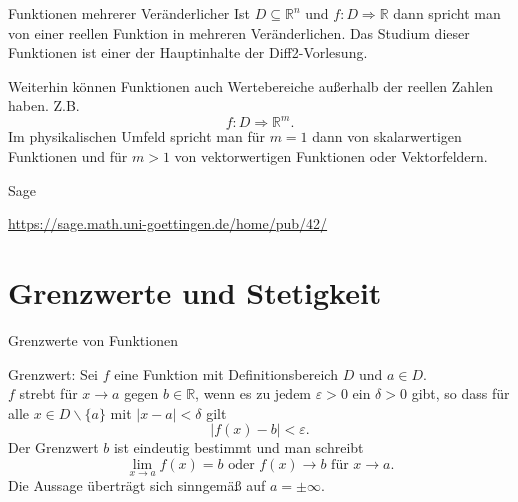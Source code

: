 \documentclass[notes=hide,hyperref={dvipdfmx,pdfpagelabels=false}]{beamer}
\begin{document}
\begin{frame}{Funktionen mehrerer Veränderlicher}
Ist $D \subseteq \mathbb{R}^n$ und $f : D \Rightarrow \mathbb{R}$ dann spricht man von
einer reellen Funktion in \alert{mehreren Veränderlichen}. Das Studium dieser Funktionen ist einer der Hauptinhalte der Diff2-Vorlesung.

\bigskip

Weiterhin können Funktionen auch Wertebereiche außerhalb der reellen Zahlen haben.
Z.B. 
\[f : D \Rightarrow \mathbb{R}^m.\]
 Im physikalischen Umfeld spricht man für $m=1$ dann von \alert{skalarwertigen Funktionen} und für $m>1$ von \alert{vektorwertigen Funktionen} oder \alert{Vektorfeldern}.
 
\end{frame}


\begin{frame}{Sage}
    \begin{center}
        \url{https://sage.math.uni-goettingen.de/home/pub/42/}
    \end{center}
\end{frame}



\section{Grenzwerte und Stetigkeit}

\begin{frame}{Grenzwerte von Funktionen}

{\color{red} Grenzwert}: Sei $f$ eine Funktion mit Definitionsbereich $D$ und $a\in D$.\\
$f$ strebt für $x \rightarrow a$ gegen $b \in \mathbb{R}$, wenn es zu jedem $\varepsilon >0$ ein $\delta >0$ gibt, so
dass für alle $x \in D\smallsetminus\{a \}$ mit $|x-a|<\delta$ gilt 
\[ |f(x)-b| < \varepsilon .\]
Der Grenzwert $b$ ist eindeutig bestimmt und man schreibt
\[ \lim_{x \rightarrow a} f(x) =b \mbox{ oder } f(x) \rightarrow b
\mbox{ für } x \rightarrow a. \]
Die Aussage überträgt sich sinngemäß auf $a=\pm \infty$.
\end{frame}
\end{document}
